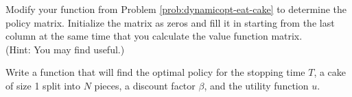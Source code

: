 
\begin{problem}
Modify your function from Problem \ref{prob:dynamicopt-eat-cake} to determine the policy matrix.
Initialize the matrix as zeros and fill it in starting from the last column at the same time that you calculate the value function matrix.
\\(Hint: You may find  useful.)
\end{problem}

\begin{problem}
Write a function  that will find the optimal policy for the stopping time $T$, a cake of size 1 split into $N$ pieces, a discount factor $\beta$, and the utility function $u$.



\end{problem}







